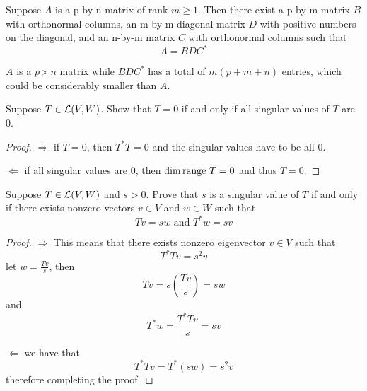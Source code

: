 \documentclass{extarticle}
\begin{document}
\begin{thm}
    Suppose \(A\) is a p-by-n matrix of rank \(m \geq 1\). Then there exist a p-by-m matrix 
    \(B\) with orthonormal columns, an m-by-m diagonal matrix \(D\) with positive numbers on 
    the diagonal, and an n-by-m matrix \(C\) with orthonormal columns such that 
    \[A = BDC^*\]
\end{thm}

\begin{remark}
    \(A\) is a \(p \times n\) matrix while \(BDC^*\) has a total of \(m(p+m+n)\) entries, which 
    could be considerably smaller than \(A\).
\end{remark}



\newpage 
{}


\begin{problem}{1}
    Suppose \(T \in \mathcal{L}(V, W)\). Show that \(T = 0\) if and only if all singular 
    values of \(T\) are 0.
\end{problem}

\begin{proof}
\(\Rightarrow\) if \(T = 0\), then \(T^*T = 0\) and the singular values have to be all 0. 

\(\Leftarrow\) if all singular values are 0, then \(\dim \text{range } T = 0\) and thus \(T = 0\).
\end{proof}

\begin{problem}{2}
    Suppose \(T \in \mathcal{L}(V, W)\) and \(s > 0\). Prove that \(s\) is a singular value of \(T\)
    if and only if there exists nonzero vectors \(v \in V\) and \(w \in W\) such that 
    \[Tv = sw \text{ and } T^* w = sv\]
\end{problem}

\begin{proof}

\(\Rightarrow\) This means that there exists nonzero eigenvector \(v \in V\) such that 
\[T^*T v = s^2 v\]
let \(w = \frac{Tv}{s}\), then 
\[Tv = s(\frac{Tv}{s}) = sw\]
and 
\[T^*w  = \frac{T^* Tv}{s} = sv\]

\(\Leftarrow\) we have that 
\[T^*Tv = T^*(sw) = s^2v\]
therefore completing the proof.
\end{proof}
\end{document}
